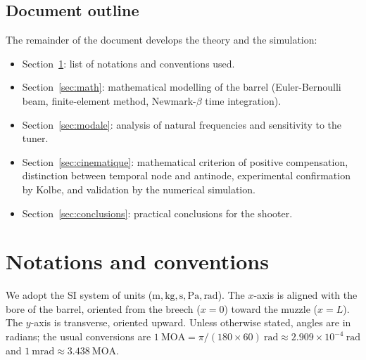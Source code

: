 \documentclass[12pt,a4paper]{article}
\begin{document}
	\subsection{Document outline}
	\label{sec:plan}

	The remainder of the document develops the theory and the simulation:
	\begin{itemize}
		\item Section~\ref{sec:notations}: list of notations and conventions used.
		\item Section~\ref{sec:math}: mathematical modelling of the barrel (Euler-Bernoulli beam, finite-element method, Newmark-$\beta$ time integration).
		\item Section~\ref{sec:modale}: analysis of natural frequencies and sensitivity to the tuner.
		\item Section~\ref{sec:cinematique}: mathematical criterion of positive compensation, distinction between temporal node and antinode, experimental confirmation by Kolbe, and validation by the numerical simulation.
		\item Section~\ref{sec:conclusions}: practical conclusions for the shooter.
	\end{itemize}

	\section{Notations and conventions}
	\label{sec:notations}

	We adopt the SI system of units ($\text{m}, \text{kg}, \text{s}, \text{Pa}, \text{rad}$). The $x$-axis is aligned with the bore of the barrel, oriented from the breech ($x=0$) toward the muzzle ($x=L$). The $y$-axis is transverse, oriented upward. Unless otherwise stated, angles are in radians; the usual conversions are
	\(1\ \text{MOA} = \pi/(180 \times 60)\ \text{rad} \approx 2.909 \times 10^{-4}\ \text{rad}\) and
	\(1\ \text{mrad} \approx 3.438\ \text{MOA}.\)
\end{document}
